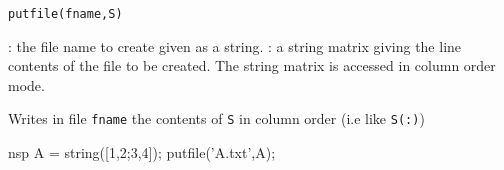 
\begin{mandesc}
\end{mandesc}
\begin{calling_sequence}
\begin{verbatim}
putfile(fname,S)
\end{verbatim}
\end{calling_sequence}
\begin{parameters}
  \begin{varlist}
    : the file name to create given as a string.
    : a string matrix giving the line contents of the file to be created. The 
    string matrix is accessed in column order mode.
  \end{varlist}
\end{parameters}

\begin{mandescription}
  Writes in file \verb+fname+ the contents of \verb+S+ in column order (i.e like \verb+S(:)+)
\end{mandescription}

\begin{examples}
  \begin{mintednsp}{nsp} 
    A = string([1,2;3,4]);
    putfile('A.txt',A);
  \end{mintednsp}
\end{examples}

\begin{manseealso}
\end{manseealso}

